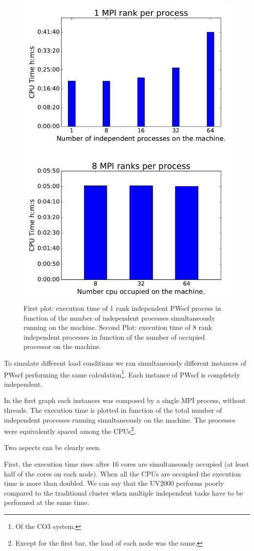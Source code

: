 \documentclass[a4paper,12pt]{article}
\newcommand\CO{CO3 }
\begin{document}
\begin{figure}[hhh!]
\begin{center}
	\captionsetup{justification=centering}
	\includegraphics[width=0.7\linewidth]{sgiLoad.pdf}	
	\caption{First plot: execution time of 1 rank independent PWscf process in function of the number of independent processes simultaneously running on the machine. Second Plot: execution time of 8 rank independent processes in function of the number of occupied processor on the machine.}
	\label{fig:sgiLoad}
\end{center}
\end{figure}

To simulate different load conditions we ran simultaneously different instances of PWscf performing the same calculation\footnote{Of the \CO system.}. Each instance of PWscf is completely independent.

In the first graph each instances was composed by a single MPI process, without threads. 
The execution time is plotted in function of the total number of independent processes running simultaneously on the machine.
The processes were equivalently spaced among the CPUs\footnote{Except for the first bar, the load of each node was the same.}.

Two aspects can be clearly seen.

First, the execution time rises after 16 cores are simultaneously occupied (at least half of the cores on each node).
When all the CPUs are occupied the execution time is more than doubled. 
We can say that the UV2000 performs poorly compared to the traditional cluster when multiple independent tasks have to be performed at the same time.
\end{document}
